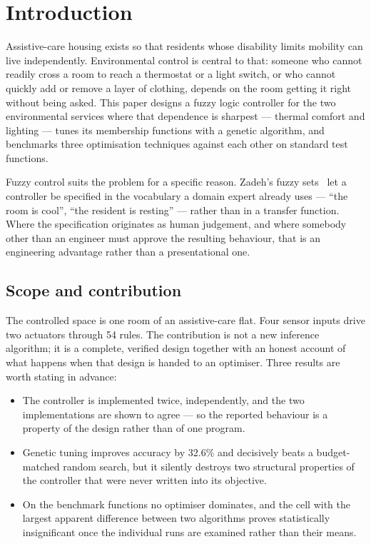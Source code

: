 %

\section{Introduction}
\label{sec:t2-intro}

Assistive-care housing exists so that residents whose disability limits
mobility can live independently. Environmental control is central to that:
someone who cannot readily cross a room to reach a thermostat or a light
switch, or who cannot quickly add or remove a layer of clothing, depends on the
room getting it right without being asked. This paper designs a fuzzy logic
controller for the two environmental services where that dependence is
sharpest --- thermal comfort and lighting --- tunes its membership functions with
a genetic algorithm, and benchmarks three optimisation techniques against each
other on standard test functions.

Fuzzy control suits the problem for a specific reason. Zadeh's fuzzy
sets~\cite{zadeh1965} let a controller be specified in the vocabulary a domain
expert already uses --- ``the room is cool'', ``the resident is resting'' ---
rather than in a transfer function. Where the specification originates as human
judgement, and where somebody other than an engineer must approve the resulting
behaviour, that is an engineering advantage rather than a presentational one.

\subsection{Scope and contribution}

The controlled space is one room of an assistive-care flat. Four sensor inputs
drive two actuators through 54 rules. The contribution is not a new inference
algorithm; it is a complete, verified design together with an honest account of
what happens when that design is handed to an optimiser. Three results are worth
stating in advance:

\begin{itemize}\itemsep2pt
\item The controller is implemented twice, independently, and the two
implementations are shown to agree --- so the reported behaviour is a property
of the design rather than of one program.
\item Genetic tuning improves accuracy by 32.6\% and decisively beats a
budget-matched random search, but it silently destroys two structural properties
of the controller that were never written into its objective.
\item On the benchmark functions no optimiser dominates, and the cell with the
largest apparent difference between two algorithms proves statistically
insignificant once the individual runs are examined rather than their means.
\end{itemize}

